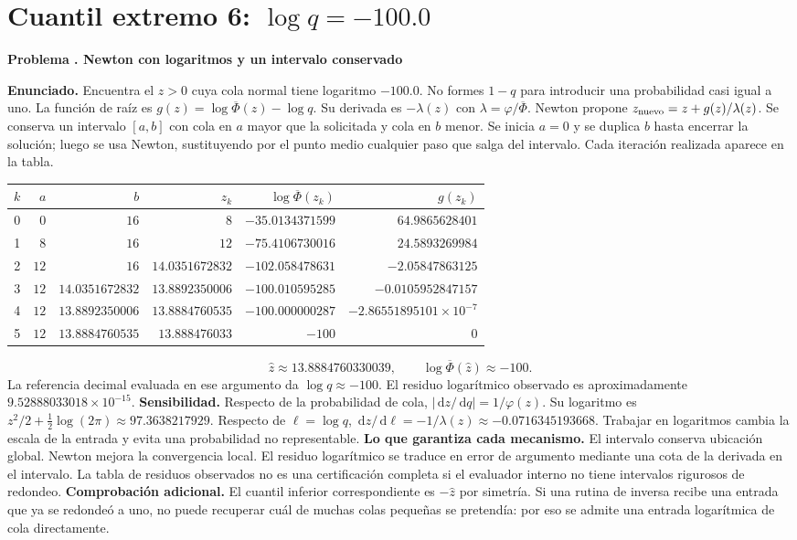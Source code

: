 \documentclass[11pt,a4paper]{article}
\newcommand{\dd}{\,\mathrm d}
\theoremstyle{definition}
\newcounter{problema}
\newenvironment{resuelto}[1]{\refstepcounter{problema}\par\medskip\Needspace{6\baselineskip}\textbf{Problema \theproblema. #1}\par}{\par\medskip}
\newcommand{\SF}{\overline\Phi}
\begin{document}
\section{\texorpdfstring{Cuantil extremo 6: $\log q=-100.0$}{Cuantil extremo 6: log q=-100.0}}
\begin{resuelto}{Newton con logaritmos y un intervalo conservado}
\textbf{Enunciado.} Encuentra el $z>0$ cuya cola normal tiene logaritmo $-100.0$. No formes $1-q$ para introducir una probabilidad casi igual a uno.
La función de raíz es $g(z)=\log\SF(z)-\log q$. Su derivada es $-\lambda(z)$ con $\lambda=\varphi/\SF$. Newton propone $z_{\rm nuevo}=z+g(z)/\lambda(z)$. Se conserva un intervalo $[a,b]$ con cola en $a$ mayor que la solicitada y cola en $b$ menor.
Se inicia $a=0$ y se duplica $b$ hasta encerrar la solución; luego se usa Newton, sustituyendo por el punto medio cualquier paso que salga del intervalo. Cada iteración realizada aparece en la tabla.

\begin{center}\small\begin{tabular}{rrrrrr}
\toprule
$k$&$a$&$b$&$z_k$&$\log\SF(z_k)$&$g(z_k)$\\
\midrule
0&$0$&$16$&$8$&$-35.0134371599$&$64.9865628401$\\
1&$8$&$16$&$12$&$-75.4106730016$&$24.5893269984$\\
2&$12$&$16$&$14.0351672832$&$-102.058478631$&$-2.05847863125$\\
3&$12$&$14.0351672832$&$13.8892350006$&$-100.010595285$&$-0.0105952847157$\\
4&$12$&$13.8892350006$&$13.8884760535$&$-100.000000287$&$-2.86551895101\times10^{-7}$\\
5&$12$&$13.8884760535$&$13.888476033$&$-100$&$0$\\
\bottomrule\end{tabular}\end{center}
\[
\widehat z\approx13.8884760330039,\qquad \log\SF(\widehat z)\approx-100.
\]
La referencia decimal evaluada en ese argumento da $\log q\approx-100$. El residuo logarítmico observado es aproximadamente $9.52888033018\times10^{-15}$.
\textbf{Sensibilidad.} Respecto de la probabilidad de cola, $|\dd z/\dd q|=1/\varphi(z)$. Su logaritmo es $z^2/2+\tfrac12\log(2\pi)\approx97.3638217929$. Respecto de $\ell=\log q$, $\dd z/\dd\ell=-1/\lambda(z)\approx-0.0716345193668$. Trabajar en logaritmos cambia la escala de la entrada y evita una probabilidad no representable.
\textbf{Lo que garantiza cada mecanismo.} El intervalo conserva ubicación global. Newton mejora la convergencia local. El residuo logarítmico se traduce en error de argumento mediante una cota de la derivada en el intervalo. La tabla de residuos observados no es una certificación completa si el evaluador interno no tiene intervalos rigurosos de redondeo.
\textbf{Comprobación adicional.} El cuantil inferior correspondiente es $-\widehat z$ por simetría. Si una rutina de inversa recibe una entrada que ya se redondeó a uno, no puede recuperar cuál de muchas colas pequeñas se pretendía: por eso se admite una entrada logarítmica de cola directamente.
\end{resuelto}
\end{document}
